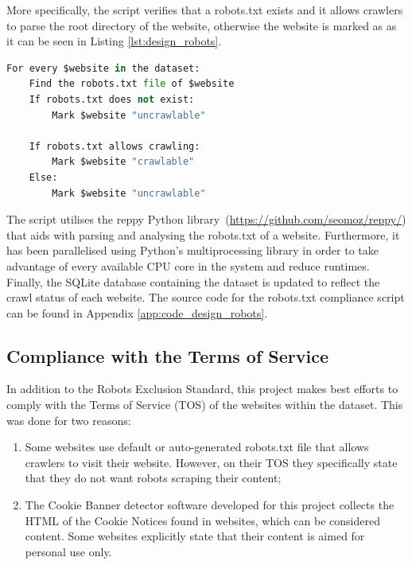\documentclass[../main.tex]{subfiles}
\begin{document}
More specifically, the script verifies that a robots.txt exists and it allows crawlers to parse the root directory of the website, otherwise the website is marked as  as it can be seen in Listing \ref{lst:design_robots}.

\begin{lstlisting}[language=Python, caption=Pseudocode of the algorithm followed by the robots.txt parser script., label=lst:design_robots,captionpos=b, style=lst_style]
For every $website in the dataset:
    Find the robots.txt file of $website
    If robots.txt does not exist:
        Mark $website "uncrawlable"
    
    If robots.txt allows crawling:
        Mark $website "crawlable"
    Else:
        Mark $website "uncrawlable"
\end{lstlisting}

The script utilises the reppy Python library~(\url{https://github.com/seomoz/reppy/}) that aids with parsing and analysing the robots.txt of a website. Furthermore, it has been parallelised using Python’s multiprocessing library in order to take advantage of every available CPU core in the system and reduce runtimes. Finally, the SQLite database containing the dataset is updated to reflect the crawl status of each website. The source code for the robots.txt compliance script can be found in Appendix \ref{app:code_design_robots}.

\subsection{Compliance with the Terms of Service}
In addition to the Robots Exclusion Standard, this project makes best efforts to comply with the Terms of Service (TOS) of the websites within the dataset. This was done for two reasons:

\begin{enumerate}
    \item Some websites use default or auto-generated robots.txt file that allows crawlers to visit their website. However, on their TOS they specifically state that they do not want robots scraping their content;
    
    \item The Cookie Banner detector software developed for this project collects the HTML of the Cookie Notices found in websites, which can be considered content. Some websites explicitly state that their content is aimed for personal use only. 
\end{enumerate}
\end{document}
